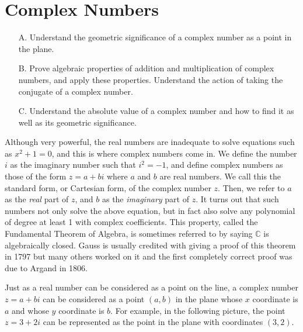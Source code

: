 \section{Complex Numbers}

\begin{outcome}
\begin{enumerate}
\item[A.]  Understand the geometric significance of a complex number as a point
in the plane.

\item[B.]  Prove algebraic properties of addition and multiplication of complex numbers, and 
apply these properties. Understand the action of taking the conjugate of a complex number.

\item[C.]  Understand the absolute value of a complex number and how to find it
as well as its geometric significance.
\end{enumerate}
\end{outcome}

Although very powerful, the real numbers are inadequate to solve
equations such as $x^2+1=0$, and this is where complex numbers come
in. We define the number $i$ as the imaginary number such that $i^2 =
-1$, and define complex numbers as those of the form $z = a + bi$
where $a$ and $b$ are real numbers. We call this the standard form, or Cartesian form, of the complex number
$z$.
 Then, we refer to $a$ as the
{\em real\em} part of $z$, and $b$ as the {\em imaginary\em} part of
$z$. It turns out that such numbers not only solve the above equation,
but in fact also solve any polynomial of degree at least 1 with complex coefficients. This property, called the Fundamental Theorem of Algebra, 
 is sometimes referred to by saying $\mathbb{C}$ is
algebraically closed. Gauss is usually credited with giving a proof
of this theorem in 1797 but many others worked on it and the first
completely correct proof was due to Argand in 1806.

Just as a real number can be considered as a point on the line, a
complex number $z = a + bi$ can be considered as a point $\left(
a,b\right) $ in the plane whose $x$ coordinate is $ a$ and whose $y$
coordinate is $b.$ For example, in the following picture, the point $z
= 3+2i$ can be represented as the point in the plane with
coordinates $\left( 3,2\right) .$

\begin{center}
\end{center}

